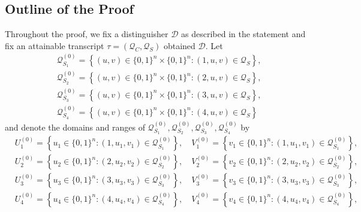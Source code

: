 \subsection{Outline of the Proof}
\label{sec:proof-sketch-4-rounds}

Throughout the proof, we fix a distinguisher $\mathcal{D}$ as described in the statement and fix an attainable transcript $\tau =\left(\mathcal{Q}_{C}, \mathcal{Q}_{S}\right)$ obtained $\mathcal{D}$. Let
%
$$
\begin{aligned}
&\mathcal{Q}_{S_{1}}^{(0)}=\left\{(u, v) \in\{0,1\}^{n} \times\{0,1\}^{n}:(1, u, v) \in \mathcal{Q}_{S} \right\},\\
&\mathcal{Q}_{S_{2}}^{(0)}=\left\{(u, v) \in\{0,1\}^{n} \times\{0,1\}^{n}:(2, u, v) \in \mathcal{Q}_{S} \right\},\\
&\mathcal{Q}_{S_{3}}^{(0)}=\left\{(u, v) \in\{0,1\}^{n} \times\{0,1\}^{n}:(3, u, v) \in \mathcal{Q}_{S} \right\},\\
&\mathcal{Q}_{S_{4}}^{(0)}=\left\{(u, v) \in\{0,1\}^{n} \times\{0,1\}^{n}:(4, u, v) \in \mathcal{Q}_{S} \right\}
\end{aligned}
$$
%
and denote the domains and ranges of $\mathcal{Q}_{S_{1}}^{(0)}, \mathcal{Q}_{S_{2}}^{(0)}, \mathcal{Q}_{S_{3}}^{(0)}, \mathcal{Q}_{S_{4}}^{(0)}$ by        {\small
%
\begin{align*}
&U_{1}^{(0)}=\left\{u_{1} \in\{0,1\}^{n}:\left(1, u_{1}, v_{1}\right) \in \mathcal{Q}_{S_{1}}^{(0)}\right\}, \quad V_{1}^{(0)}=\left\{v_{1} \in\{0,1\}^{n}:\left(1, u_{1}, v_{1}\right) \in \mathcal{Q}_{S_{1}}^{(0)}\right\},\\
&U_{2}^{(0)}=\left\{u_{2} \in\{0,1\}^{n}:\left(2, u_{2}, v_{2}\right) \in \mathcal{Q}_{S_{2}}^{(0)}\right\}, \quad V_{2}^{(0)}=\left\{v_{2} \in\{0,1\}^{n}:\left(2, u_{2}, v_{2}\right) \in \mathcal{Q}_{S_{2}}^{(0)}\right\},\\
&U_{3}^{(0)}=\left\{u_{3} \in\{0,1\}^{n}:\left(3, u_{3}, v_{3}\right) \in \mathcal{Q}_{S_{3}}^{(0)}\right\}, \quad V_{3}^{(0)}=\left\{v_{3} \in\{0,1\}^{n}:\left(3, u_{3}, v_{3}\right) \in \mathcal{Q}_{S_{3}}^{(0)}\right\},\\
&U_{4}^{(0)}=\left\{u_{4} \in\{0,1\}^{n}:\left(4, u_{4}, v_{4}\right) \in \mathcal{Q}_{S_{4}}^{(0)}\right\}, \quad V_{4}^{(0)}=\left\{v_{4} \in\{0,1\}^{n}:\left(4, u_{4}, v_{4}\right) \in \mathcal{Q}_{S_{4}}^{(0)}\right\},
\end{align*}
}%
%




